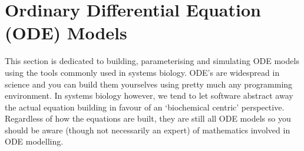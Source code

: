 \documentclass[../main]{subfiles}
\begin{document}
    \section{Ordinary Differential Equation (ODE) Models}
    This section is dedicated to building, parameterising and simulating ODE models using the tools
    commonly used in systems biology. ODE's are widespread in science and you can build them yourselves
    using pretty much any programming environment. In systems biology however, we tend to let
    software abstract away the actual equation building in favour of an `biochemical centric' perspective. Regardless
    of how the equations are built, they are still all ODE models so you should be aware (though not necessarily an
    expert) of mathematics involved in ODE modelling.

    
    
\end{document}
